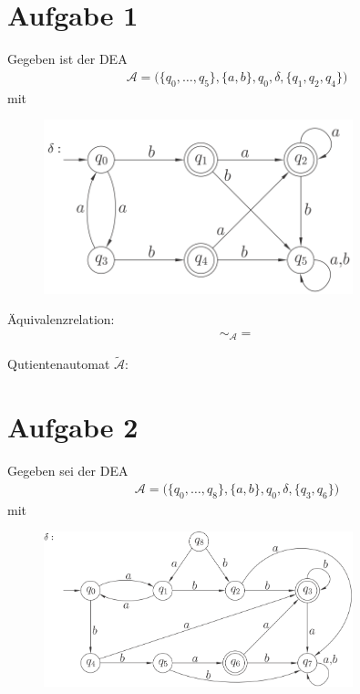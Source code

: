 \documentclass[12pt,a4paper]{article}
\newcommand{\A}{\mathcal{A}}
\begin{document}
\section*{Aufgabe 1}
Gegeben ist der DEA
\begin{align*}
	\A=\Big(\lbrace q_0,\ldots,q_5\rbrace,\lbrace a,b\rbrace,q_0,\delta,\lbrace q_1,q_2,q_4\rbrace\Big)
\end{align*}
mit
\begin{figure}[H] 
	\begin{center}
		\includegraphics[width=0.8\textwidth]{Blatt9.png}
	\end{center}
\end{figure}

Äquivalenzrelation:
\begin{align*}
	\sim_\A=
\end{align*}

Qutientenautomat $\tilde{\A}$:


\section*{Aufgabe 2}
Gegeben sei der DEA
\begin{align*}
	\A=\Big(\lbrace q_0,\ldots,q_8\rbrace,\lbrace a,b\rbrace, q_0,\delta,\lbrace q_3,q_6\rbrace\Big)
\end{align*}
mit
\begin{figure}[H] 
	\begin{center}
		\includegraphics[width=0.8\textwidth]{Blatt9_2.png}
	\end{center}
\end{figure}
\end{document}
